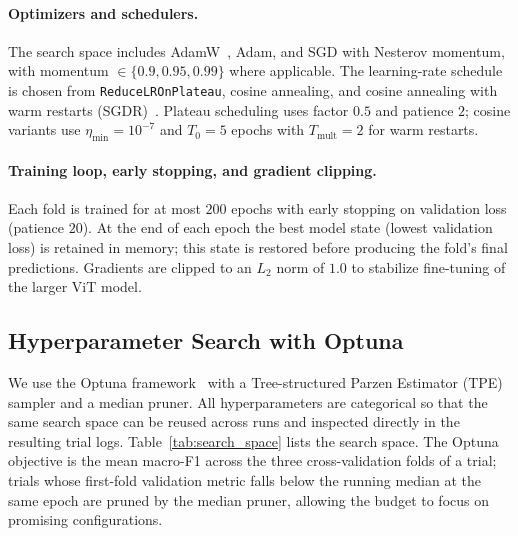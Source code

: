 \documentclass[conference]{IEEEtran}
\begin{document}
\paragraph{Optimizers and schedulers.}
The search space includes AdamW~\cite{loshchilov2019adamw}, Adam, and SGD with Nesterov momentum, with momentum $\in \{0.9, 0.95, 0.99\}$ where applicable. The learning-rate schedule is chosen from \texttt{ReduceLROnPlateau}, cosine annealing, and cosine annealing with warm restarts (SGDR)~\cite{loshchilov2017sgdr}. Plateau scheduling uses factor $0.5$ and patience $2$; cosine variants use $\eta_{\min}=10^{-7}$ and $T_0=5$ epochs with $T_{\text{mult}}=2$ for warm restarts.

\paragraph{Training loop, early stopping, and gradient clipping.}
Each fold is trained for at most $200$ epochs with early stopping on validation loss (patience $20$). At the end of each epoch the best model state (lowest validation loss) is retained in memory; this state is restored before producing the fold's final predictions. Gradients are clipped to an $L_2$ norm of $1.0$ to stabilize fine-tuning of the larger ViT model.

\subsection{Hyperparameter Search with Optuna}
\label{ssec:optuna}

We use the Optuna framework~\cite{akiba2019optuna} with a Tree-structured Parzen Estimator (TPE) sampler and a median pruner. All hyperparameters are categorical so that the same search space can be reused across runs and inspected directly in the resulting trial logs. Table~\ref{tab:search_space} lists the search space. The Optuna objective is the mean macro-F1 across the three cross-validation folds of a trial; trials whose first-fold validation metric falls below the running median at the same epoch are pruned by the median pruner, allowing the budget to focus on promising configurations.
\end{document}
